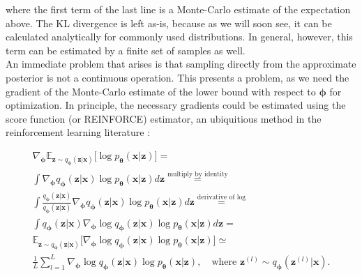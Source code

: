 \documentclass{report}
\begin{document}
\bigskip

\noindent where the first term of the last line is a Monte-Carlo estimate of the expectation above. The KL divergence is left as-is, because as we will soon see, it can be calculated analytically for commonly used distributions. In general, however, this term can be estimated by a finite set of samples as well. \\

\noindent An immediate problem that arises is that sampling directly from the approximate posterior is not a continuous operation. This presents a problem, as we need the gradient of the Monte-Carlo estimate of the lower bound with respect to $\boldsymbol{\phi}$ for optimization. In principle, the necessary gradients could be estimated using the score function (or REINFORCE) estimator, an ubiquitious method in the reinforcement learning literature \cite{Williams1992}:

\begin{gather*}
\nabla_{\boldsymbol{\phi}} \mathbb{E}_{\boldsymbol{z} \sim q_{\boldsymbol{\phi}}(\boldsymbol{z}|\boldsymbol{x})} \big[ \log p_{\boldsymbol{\theta}} (\boldsymbol{x} | \boldsymbol{z}) \big] = \\
\int \nabla_{\boldsymbol{\phi}} q_{\boldsymbol{\phi}}(\boldsymbol{z}|\boldsymbol{x}) \log p_{\boldsymbol{\theta}}(\boldsymbol{x} | \boldsymbol{z}) d \boldsymbol{z} \stackrel{\text{multiply by identity}}{=} \\
\int \frac{q_{\boldsymbol{\phi}}(\boldsymbol{z}|\boldsymbol{x})}{q_{\boldsymbol{\phi}}(\boldsymbol{z}|\boldsymbol{x})} \nabla_{\boldsymbol{\phi}} q_{\boldsymbol{\phi}}(\boldsymbol{z}|\boldsymbol{x}) \log p_{\boldsymbol{\theta}}(\boldsymbol{x} | \boldsymbol{z}) d \boldsymbol{z} \stackrel{\text{derivative of log}}{=} \\
\int q_{\boldsymbol{\phi}}(\boldsymbol{z}|\boldsymbol{x}) \nabla_{\boldsymbol{\phi}} \log q_{\boldsymbol{\phi}}(\boldsymbol{z}|\boldsymbol{x}) \log p_{\boldsymbol{\theta}}(\boldsymbol{x} | \boldsymbol{z}) d \boldsymbol{z} = \\
\mathbb{E}_{\boldsymbol{z} \sim q_{\boldsymbol{\phi}}(\boldsymbol{z}|\boldsymbol{x})} \big[ \nabla_{\boldsymbol{\phi}} \log q_{\boldsymbol{\phi}}(\boldsymbol{z}|\boldsymbol{x}) \log p_{\boldsymbol{\theta}}(\boldsymbol{x} | \boldsymbol{z}) \big] \simeq \\
\frac{1}{L} \sum_{l=1}^L \nabla_{\boldsymbol{\phi}} \log q_{\boldsymbol{\phi}}(\boldsymbol{z}|\boldsymbol{x}) \log p_{\boldsymbol{\theta}}(\boldsymbol{x} | \boldsymbol{z}), \quad \text{where } \boldsymbol{z}^{(l)} \sim q_{\boldsymbol{\phi}}(\boldsymbol{z}^{(l)} | \boldsymbol{x}).
\end{gather*}
\end{document}
